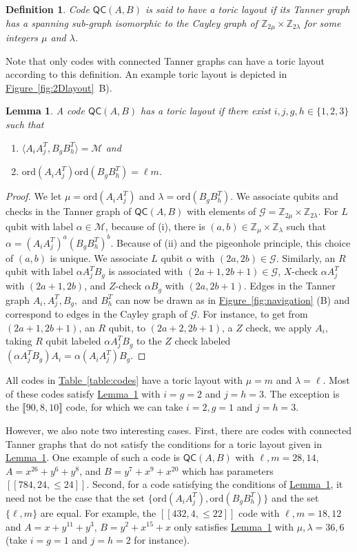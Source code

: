 \documentclass{article}
\newcommand{\ord}[1]{\mathrm{ord}(#1)}
\newcommand{\qc}{\mathsf{QC}(A,B)}
\newtheorem{dfn}{Definition}
\newtheorem{lemma}{Lemma}
\newcommand{\fig}[1]{\hyperref[fig:#1]{Figure~\ref*{fig:#1}}}
\newcommand{\tab}[1]{\hyperref[table:#1]{Table~\ref*{table:#1}}}
\newcommand{\lem}[1]{\hyperref[lem:#1]{Lemma~\ref*{lem:#1}}}
\begin{document}
\begin{dfn}
Code $\qc$ is said to have a toric layout if its Tanner graph has a spanning sub-graph isomorphic to the Cayley graph of $\mathbb{Z}_{2\mu}\times\mathbb{Z}_{2\lambda}$ for some integers $\mu$ and $\lambda$.
\end{dfn}

Note that only codes with connected Tanner graphs can have a toric layout according to this definition. An example toric layout is depicted in \fig{2Dlayout}~B).

\begin{lemma}\label{lem:toric_layout}
A code $\qc$ has a toric layout if there exist $i,j,g,h\in\{1,2,3\}$ such that
\begin{enumerate}[label=(\roman*)]
\item $\langle A_iA_j^T,B_gB_h^T\rangle=\mathcal{M}$ and
\item $\ord{A_iA_j^T}\ord{B_gB_h^T}=\ell m$.
\end{enumerate}
\end{lemma}
\begin{proof}
We let $\mu=\ord{A_iA_j^T}$ and $\lambda=\ord{B_gB_h^T}$. We associate qubits and checks in the Tanner graph of $\qc$ with elements of $\mathcal{G}=\mathbb{Z}_{2\mu}\times\mathbb{Z}_{2\lambda}$. For $L$ qubit with label $\alpha\in \mathcal{M}$, because of (i), there is $(a,b)\in\mathbb{Z}_{\mu}\times\mathbb{Z}_{\lambda}$ such that $\alpha=(A_iA_j^T)^a(B_gB_h^T)^b$. Because of (ii) and the pigeonhole principle, this choice of $(a,b)$ is unique. We associate $L$ qubit $\alpha$ with $(2a,2b)\in\mathcal{G}$. Similarly, an $R$ qubit with label $\alpha A^T_jB_g$ is associated with $(2a+1,2b+1)\in\mathcal{G}$, $X$-check $\alpha A^T_j$ with $(2a+1,2b)$, and $Z$-check $\alpha B_g$ with $(2a,2b+1)$. Edges in the Tanner graph $A_i,A^T_j,B_g,$ and $B_h^T$ can now be drawn as in \fig{navigation} (B) and correspond to edges in the Cayley graph of $\mathcal{G}$. For instance, to get from $(2a+1,2b+1)$, an $R$ qubit, to $(2a+2,2b+1)$, a $Z$ check, we apply $A_i$, taking $R$ qubit labeled $\alpha A^T_jB_g$ to the $Z$ check labeled $(\alpha A^T_jB_g)A_i=\alpha(A_iA_j^T)B_g$.
\end{proof}

All codes in \tab{codes} have a toric layout with $\mu=m$ and $\lambda=\ell$. Most of these codes satisfy \lem{toric_layout} with $i=g=2$ and $j=h=3$. The exception is the $\llbracket90,8,10\rrbracket$ code, for which we can take $i=2,g=1$ and $j=h=3$.

However, we also note two interesting cases. First, there are codes with connected Tanner graphs that do not satisfy the conditions for a toric layout given in \lem{toric_layout}. 
One example of such a code is
$\qc$
with $\ell,m=28,14$,
$A=x^{26}+y^6 + y^8$, and
$B=y^7+x^9+x^{20}$
which has parameters $[[784,24,\le 24]]$.
Second, for a code satisfying the conditions of \lem{toric_layout}, it need not be the case that the set $\{\ord{A_iA_j^T},\ord{B_gB_h^T}\}$ and the set $\{\ell,m\}$ are equal. For example, the $[[432,4,\le22]]$ code with $\ell,m=18,12$ and $A=x+y^{11}+y^3$, $B=y^2+x^{15}+x$ only satisfies \lem{toric_layout} with $\mu,\lambda=36,6$ (take $i=g=1$ and $j=h=2$ for instance). 
\end{document}
